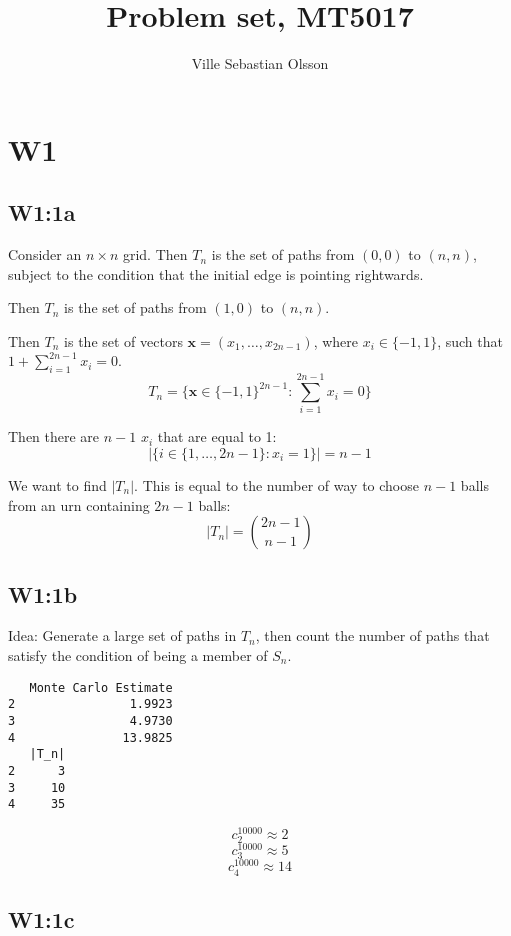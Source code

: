 \documentclass{article}
\title{Problem set, MT5017}
\author{Ville Sebastian Olsson}
\begin{document}
\maketitle
\tableofcontents

\section{W1}

\subsection{W1:1a}

Consider an \(n\times n\) grid.
Then \(T_n\) is the set of paths from \((0,0)\) to \((n,n)\),
subject to the condition that the initial edge is pointing rightwards.

Then \(T_n\) is the set of paths from \((1,0)\) to \((n,n)\).

Then \(T_n\) is the set of vectors \(\mathbf{x} = (x_1,\ldots,x_{2n-1})\),
where \(x_i\in \{-1,1\}\),
such that \(1+\sum_{i=1}^{2n-1} x_i = 0\).
\[T_n = \{ \mathbf{x}\in \{-1,1\}^{2n-1}: \sum_{i=1}^{2n-1} x_i = 0\}\]

Then there are \(n-1\) \(x_i\) that are equal to 1:
\[|\{i \in \{1,\ldots,2n-1\}: x_i = 1\}| = n-1\]

We want to find \(|T_n|\). This is equal to the number of way to choose \(n-1\) balls
from an urn containing \(2n-1\) balls:
\[|T_n| = \binom{2n-1}{n-1}\]

\subsection{W1:1b}

Idea: Generate a large set of paths in \(T_n\), then
count the number of paths that satisfy the condition of being a member of \(S_n\).

\begin{minipage}{\linewidth}
\begin{lstlisting}
   Monte Carlo Estimate
2                1.9923
3                4.9730
4               13.9825
   |T_n|
2      3
3     10
4     35
\end{lstlisting}
\end{minipage}

\[c_2^{10000} \approx 2\]
\[c_3^{10000} \approx 5\]
\[c_4^{10000} \approx 14\]

\subsection{W1:1c}
\end{document}

